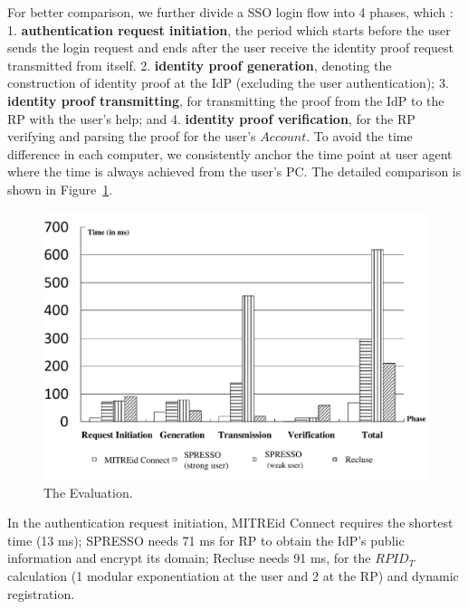 For better comparison, we further divide a SSO login flow into 4 phases, which : 1. \textbf{authentication request initiation}, the period which starts before the user sends the login request and ends after the user receive the identity proof request transmitted from itself. 
2. \textbf{identity proof generation}, denoting the construction of identity proof at the IdP (excluding the user authentication); 3. \textbf{identity proof transmitting}, for transmitting the proof from the IdP to the RP with the user's help; and 4. \textbf{identity proof verification}, for the RP  verifying and parsing the proof for the user's $Account$. To avoid the time difference in each computer, we consistently anchor the time point at user agent where the time is always achieved from the user's PC. The detailed comparison is shown in Figure~\ref{fig:evaluation}.



\begin{figure}
  \centering
  \includegraphics[width=\linewidth]{fig/evaluation.pdf}
  \caption{The Evaluation.}
  \label{fig:evaluation}
\end{figure}
In the authentication request initiation, MITREid Connect requires the shortest time (13 ms); SPRESSO needs 71 ms for RP to obtain the IdP's public information and encrypt its domain; Recluse needs 91 ms, for the $RPID_T$ calculation (1 modular exponentiation at the user and 2 at the RP) and dynamic registration.

